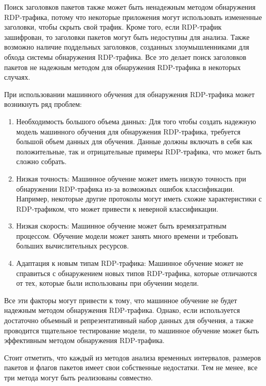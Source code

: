 \documentclass[bachelor, och, coursework]{SCWorks}
\begin{document}
Поиск заголовков пакетов также может быть ненадежным методом обнаружения RDP-трафика, потому что некоторые приложения могут использовать 
измененные заголовки, чтобы скрыть свой трафик. Кроме того, если RDP-трафик зашифрован, то заголовки пакетов могут быть недоступны для 
анализа. Также возможно наличие поддельных заголовков, созданных злоумышленниками для обхода системы обнаружения RDP-трафика. Все это 
делает поиск заголовков пакетов не надежным методом для обнаружения RDP-трафика в некоторых случаях.

При использовании машинного обучения для обнаружения RDP-трафика может возникнуть ряд проблем:

\begin{enumerate}
  \item Необходимость большого объема данных: Для того чтобы создать надежную модель машинного обучения для обнаружения RDP-трафика, 
  требуется большой объем данных для обучения. Данные должны включать в себя как положительные, так и отрицательные примеры RDP-трафика, 
  что может быть сложно собрать.
  \item Низкая точность: Машинное обучение может иметь низкую точность при обнаружении RDP-трафика из-за возможных ошибок классификации. 
  Например, некоторые другие протоколы могут иметь схожие характеристики с RDP-трафиком, что может привести к неверной классификации.
  \item Низкая скорость: Машинное обучение может быть времязатратным процессом. Обучение модели может занять много времени и требовать 
  больших вычислительных ресурсов.
  \item Адаптация к новым типам RDP-трафика: Машинное обучение может не справиться с обнаружением новых типов RDP-трафика, которые 
  отличаются от тех, которые были использованы при обучении модели.
\end{enumerate}

Все эти факторы могут привести к тому, что машинное обучение не будет надежным методом обнаружения RDP-трафика. Однако, если используется 
достаточно объемный и репрезентативный набор данных для обучения, а также проводится тщательное тестирование модели, то машинное обучение
может быть эффективным методом обнаружения RDP-трафика.



Стоит отметить, что каждый из методов анализа временных интервалов, размеров пакетов и флагов пакетов имеет свои собственные недостатки. 
Тем не менее, все три метода могут быть реализованы совместно. 
\end{document}
